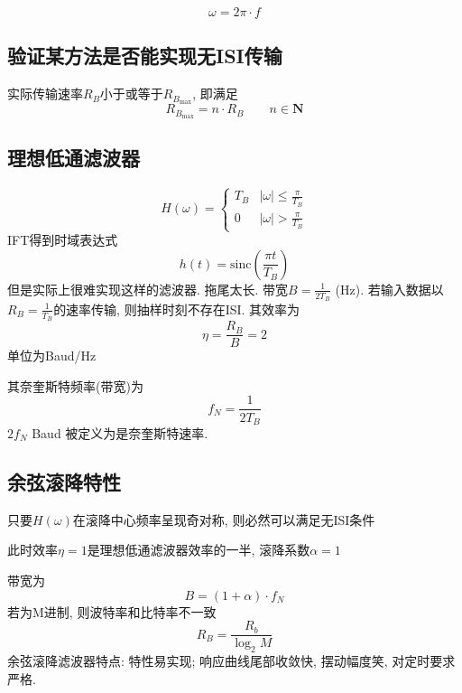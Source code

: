 \documentclass[a4paper]{report}
\begin{document}
\begin{equation}
  \omega=2\pi\cdot f
\end{equation}
\subsection{验证某方法是否能实现无ISI传输}
实际传输速率$R_B$小于或等于$R_{B_{\max}}$, 即满足
\begin{equation}
  R_{B_{\max}}=n\cdot R_B \qquad n\in\textbf{N}
\end{equation}
\subsection{理想低通滤波器}
\begin{equation}
  H(\omega)=\begin{cases}
    T_B&\lvert \omega \rvert\leq \frac{\pi}{T_B}
    \\ 0&\lvert \omega \rvert> \frac{\pi}{T_B}
  \end{cases}
\end{equation}
IFT得到时域表达式
\begin{equation}
  h(t)=\text{sinc}(\frac{\pi t}{T_B})
\end{equation}
但是实际上很难实现这样的滤波器. 拖尾太长. 
带宽$B=\frac{1}{2T_B}$ (Hz). 若输入数据以$R_B=\frac{1}{T_B}$的速率传输, 则抽样时刻不存在ISI. 其效率为\begin{equation}
  \eta=\frac{R_B}{B}=2
\end{equation}
单位为Baud/Hz

其奈奎斯特频率(带宽)为\begin{equation}
  f_N=\frac{1}{2T_B}
\end{equation}
$2f_N$ Baud 被定义为是奈奎斯特速率. 
\subsection{余弦滚降特性}
只要$H(\omega)$在滚降中心频率呈现奇对称, 则必然可以满足无ISI条件

此时效率$\eta=1$是理想低通滤波器效率的一半, 滚降系数$\alpha=1$

带宽为
\begin{equation}
  B=(1+\alpha)\cdot f_N
\end{equation}
若为M进制, 则波特率和比特率不一致
\begin{equation}
  R_B=\frac{R_b}{\log_2{M}}
\end{equation}
余弦滚降滤波器特点: 特性易实现; 响应曲线尾部收敛快, 摆动幅度笑, 对定时要求严格. 
\end{document}
